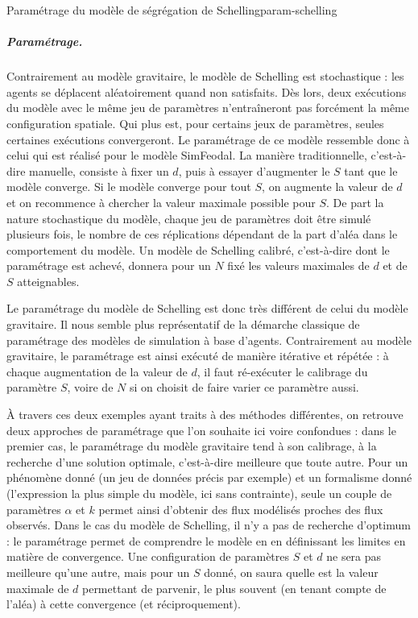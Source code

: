 \begin{encadre}{Paramétrage du modèle de ségrégation de Schelling}{param-schelling}
\subparagraph{Paramétrage.}
Contrairement au modèle gravitaire, le modèle de Schelling est stochastique :
 	les agents se déplacent aléatoirement quand non satisfaits.
Dès lors, deux exécutions du modèle avec le même jeu de paramètres n'entraîneront pas forcément la même configuration spatiale.
Qui plus est, pour certains jeux de paramètres, seules certaines exécutions convergeront.
Le paramétrage de ce modèle ressemble donc à celui qui est réalisé pour le modèle SimFeodal.
La manière \og traditionnelle\fg{}, c'est-à-dire manuelle,
consiste à fixer un $d$, puis à essayer d'augmenter le $S$ tant que le modèle converge.
Si le modèle converge pour tout $S$, on augmente la valeur de $d$ et on recommence à chercher la valeur maximale possible pour $S$.
De part la nature stochastique du modèle, chaque jeu de paramètres doit être simulé plusieurs fois, le nombre de ces réplications dépendant de la part d'aléa dans le comportement du modèle.
Un modèle de Schelling calibré, c'est-à-dire dont le paramétrage est achevé,
donnera pour un $N$ fixé les valeurs maximales de $d$ et de $S$ atteignables.
\end{encadre}

Le paramétrage du modèle de Schelling est donc très différent de celui du modèle gravitaire.
Il nous semble plus représentatif de la démarche classique de paramétrage des modèles de simulation à base d'agents.
Contrairement au modèle gravitaire, le paramétrage est ainsi exécuté de manière itérative et répétée : à chaque augmentation de la valeur de $d$, il faut ré-exécuter le calibrage du paramètre $S$, voire de $N$ si on choisit de faire varier ce paramètre aussi.


À travers ces deux exemples ayant traits à des méthodes différentes, on retrouve deux approches de paramétrage que l'on souhaite ici voire confondues :
	dans le premier cas, le paramétrage du modèle gravitaire tend à son calibrage, à la recherche d'une solution optimale, c'est-à-dire meilleure que toute autre.
Pour un phénomène donné (un jeu de données précis par exemple) et un formalisme donné (l'expression la plus simple du modèle, ici sans contrainte), seule un couple de paramètres $\alpha$ et $k$ permet ainsi d'obtenir des flux modélisés proches des flux observés.
Dans le cas du modèle de Schelling, il n'y a pas de recherche d'optimum :
	le paramétrage permet de comprendre le modèle en en définissant les limites en matière de convergence.
Une configuration de paramètres $S$ et $d$ ne sera pas meilleure qu'une autre, mais pour un $S$ donné, on saura quelle est la valeur maximale de $d$ permettant de parvenir, le plus souvent (en tenant compte de l'aléa) à cette convergence (et réciproquement).

